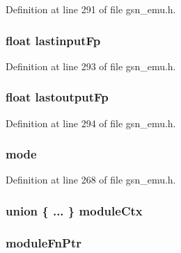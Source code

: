 Definition at line 291 of file gsn\_\-emu.h.

\hypertarget{a00059_a1c6c6aff6522961bb66f41aa1c81a675}{
\subsubsection[{lastinputFp}]{\setlength{\rightskip}{0pt plus 5cm}float {\bf lastinputFp}}}
\label{a00059_a1c6c6aff6522961bb66f41aa1c81a675}


Definition at line 293 of file gsn\_\-emu.h.

\hypertarget{a00059_a69a4982d994b218ddb7ed81c02dfc28b}{
\subsubsection[{lastoutputFp}]{\setlength{\rightskip}{0pt plus 5cm}float {\bf lastoutputFp}}}
\label{a00059_a69a4982d994b218ddb7ed81c02dfc28b}


Definition at line 294 of file gsn\_\-emu.h.

\hypertarget{a00059_a1174c25ab9eb5a4d0559dc01ef4362d4}{
\subsubsection[{mode}]{ {\bf mode}}}
\label{a00059_a1174c25ab9eb5a4d0559dc01ef4362d4}


Definition at line 268 of file gsn\_\-emu.h.

\hypertarget{a00059_add10e330d91fd521da66792db609c654}{
\subsubsection[{moduleCtx}]{\setlength{\rightskip}{0pt plus 5cm}union \{ ... \}  {\bf moduleCtx}}}
\label{a00059_add10e330d91fd521da66792db609c654}
\hypertarget{a00059_a12640fd70a84f1a68ebb56a244c86722}{
\subsubsection[{moduleFnPtr}]{ {\bf moduleFnPtr}}}
\label{a00059_a12640fd70a84f1a68ebb56a244c86722}


